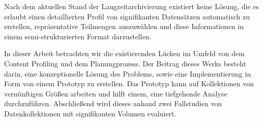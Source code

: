 Nach dem aktuellen Stand der Langzeitarchivierung existiert keine L\"{o}sung, die es erlaubt einen detaillierten Profil von signifikanten Datens\"{a}tzen automatisch zu erstellen, repr\"{a}sentative Teilmengen auszuw\"{a}hlen und diese Informationen in einem semi-strukturierten Format darzustellen.

In dieser Arbeit betrachten wir die existierenden L\"{u}cken im Umfeld von dem Content Profiling und dem Planungprozess.
Der Beitrag dieses Werks besteht darin, eine konzeptionelle L\"{o}sung des Problems, sowie eine Implementierung in Form von einem Prototyp zu erstellen.
Das Prototyp kann auf Kollektionen von vern\"{u}nftigen Gr\"{o}{\ss}en arbeiten und hilft einem, eine tiefgehende Analyse durchzuf\"{u}hren.
Abschlie{\ss}end wird dieses anhand zwei Fallstudien von Datenkollektionen mit signifikanten Volumen evaluiert.


